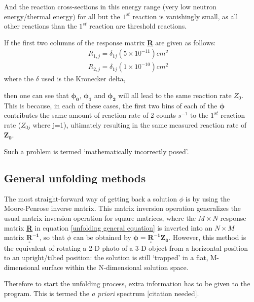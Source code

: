 \documentclass[a4paper, 12pt]{article}
\newcommand{\matr}[1]{\underline{\underline{\textbf{#1}}}}
\newcommand{\ve}[1]{\boldsymbol{#1}}
\begin{document}
And the reaction cross-sections in this energy range (very low neutron energy/thermal energy) for all but the $1^{st}$ reaction is vanishingly small, as all other reactions than the $1^{st}$ reaction are threshold reactions.

If the first two columns of the response matrix \matr{R} are given as follows:
\begin{align}
    R_{1,j} = \delta_{1j}(5 \times 10^{-11}) cm^2 \\
    R_{2,j} = \delta_{1j}(1 \times 10^{-10}) cm^2
\end{align}
where the $\delta$ used is the Kronecker delta,

then one can see that $\ve{\phi_{0}}$, $\ve{\phi_{1}}$ and $\ve{\phi_2}$ will all lead to the same reaction rate $Z_{0}$. This is because, in each of these cases, the first two bins of each of the $\ve{\phi}$ contributes the same amount of reaction rate of 2 counts $s^{-1}$ to the $1^{st}$ reaction rate ($Z_{0j}$ where j=1), ultimately resulting in the same measured reaction rate of $\ve{Z_{0}}$.

Such a problem is termed `mathematically incorrectly posed'. \cite{BirminghamUnfolding}


\subsection{General unfolding methods} \label{general methods}
The most straight-forward way of getting back a solution $\phi$ is by using the Moore-Penrose inverse matrix. This matrix inversion operation generalizes the usual matrix inversion operation for square matrices, where the $M\times N$ response matrix \matr{R} in equation \ref{unfolding general equation} is inverted into an $N \times M$ matrix $\mathbf{\underline{\underline{R}}^{-1}}$, so that $\phi$ can be obtained by $\ve{\phi} = \mathbf{\underline{\underline{R}}^{-1}} \ve{Z_0}$. However, this method is the equivalent of rotating a 2-D photo of a 3-D object from a horizontal position to an upright/tilted position: the solution is still `trapped' in a flat, M-dimensional surface within the N-dimensional solution space.

Therefore to start the unfolding process, extra information has to be given to the program. This is termed the \emph{a priori} spectrum [citation needed].
\end{document}

